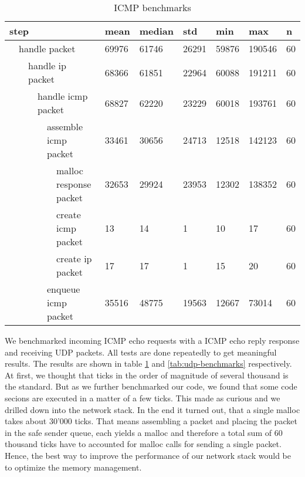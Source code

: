 \begin{table}
    \begin{tabular}{|llllll|l|l|l|l|l|l|}
    \hline
    \multicolumn{6}{|l|}{step} & mean & median & std & min & max & n \\ \hline
    \multicolumn{1}{|l|}{} & \multicolumn{5}{l|}{handle packet} & 69976 & 61746 & 26291 & 59876 & 190546 & 60 \\
    \multicolumn{1}{|l|}{} & \multicolumn{1}{l|}{} & \multicolumn{4}{l|}{handle ip packet} & 68366 & 61851 & 22964 & 60088 & 191211 & 60 \\
    \multicolumn{1}{|l|}{} & \multicolumn{1}{l|}{} & \multicolumn{1}{l|}{} & \multicolumn{3}{l|}{handle icmp packet} & 68827 & 62220 & 23229 & 60018 & 193761 & 60 \\
    \multicolumn{1}{|l|}{} & \multicolumn{1}{l|}{} & \multicolumn{1}{l|}{} & \multicolumn{1}{l|}{} & \multicolumn{2}{l|}{assemble icmp packet} & 33461 & 30656 & 24713 & 12518 & 142123 & 60 \\
    \multicolumn{1}{|l|}{} & \multicolumn{1}{l|}{} & \multicolumn{1}{l|}{} & \multicolumn{1}{l|}{} & \multicolumn{1}{l|}{} & malloc response packet & 32653 & 29924 & 23953 & 12302 & 138352 & 60 \\
    \multicolumn{1}{|l|}{} & \multicolumn{1}{l|}{} & \multicolumn{1}{l|}{} & \multicolumn{1}{l|}{} & \multicolumn{1}{l|}{} & create icmp packet & 13 & 14 & 1 & 10 & 17 & 60 \\
    \multicolumn{1}{|l|}{} & \multicolumn{1}{l|}{} & \multicolumn{1}{l|}{} & \multicolumn{1}{l|}{} & \multicolumn{1}{l|}{} & create ip packet & 17 & 17 & 1 & 15 & 20 & 60 \\
    \multicolumn{1}{|l|}{} & \multicolumn{1}{l|}{} & \multicolumn{1}{l|}{} & \multicolumn{1}{l|}{} & \multicolumn{2}{l|}{enqueue icmp packet} & 35516 & 48775 & 19563 & 12667 & 73014 & 60 \\
    \hline
    \end{tabular}
    \caption{ICMP benchmarks}
    \label{tab:icmp-benchmarks}
\end{table}

We benchmarked incoming ICMP echo requests with a ICMP echo reply response and
receiving UDP packets. All tests are done repeatedly to get meaningful results. 
The results are shown in table \ref{tab:icmp-benchmarks} and
\ref{tab:udp-benchmarks} respectively. At first, we thought that ticks in the
order of magnitude of several thousand is the standard. But as we further
benchmarked our code, we found that some code secions are executed in a matter
of a few ticks. This made as curious and we drilled down into the network stack.
In the end it turned out, that a single malloc takes about 30'000 ticks. That
means assembling a packet and placing the packet in the safe sender queue, each
yields a malloc and therefore a total sum of 60 thousand ticks have to accounted
for malloc calls for sending a single packet.  Hence, the best way to improve
the performance of our network stack would be to optimize the memory management.


